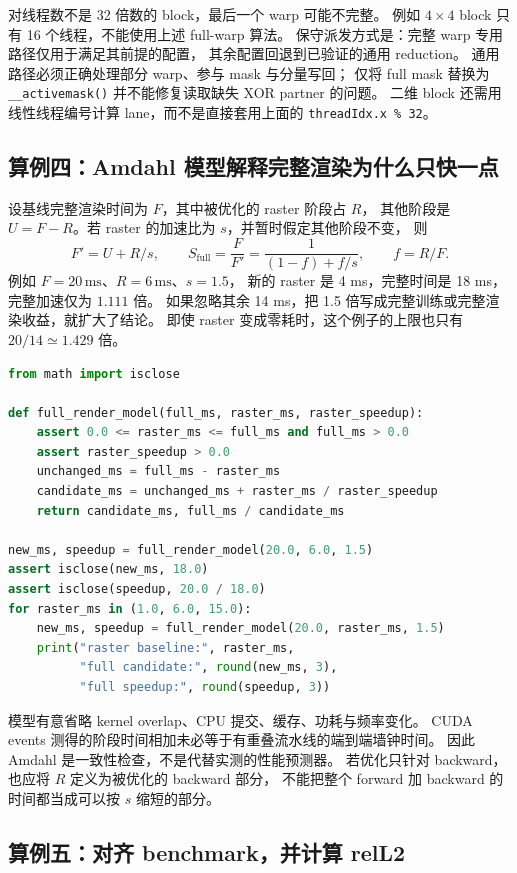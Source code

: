 对线程数不是 32 倍数的 block，最后一个 warp 可能不完整。
例如 \(4\times4\) block 只有 16 个线程，不能使用上述 full-warp 算法。
保守派发方式是：完整 warp 专用路径仅用于满足其前提的配置，
其余配置回退到已验证的通用 reduction。
通用路径必须正确处理部分 warp、参与 mask 与分量写回；
仅将 full mask 替换为 \texttt{\_\_activemask()} 并不能修复读取缺失 XOR partner 的问题。
二维 block 还需用线性线程编号计算 lane，而不是直接套用上面的
\texttt{threadIdx.x \% 32}。

\subsection{算例四：Amdahl 模型解释完整渲染为什么只快一点}

设基线完整渲染时间为 \(F\)，其中被优化的 raster 阶段占 \(R\)，
其他阶段是 \(U=F-R\)。若 raster 的加速比为 \(s\)，并暂时假定其他阶段不变，
则
\[
 F'=U+R/s,\qquad
 S_{\mathrm{full}}=\frac{F}{F'}
 =\frac{1}{(1-f)+f/s},\qquad f=R/F.
\]
例如 \(F=20\,\mathrm{ms}\)、\(R=6\,\mathrm{ms}\)、\(s=1.5\)，
新的 raster 是 4 ms，完整时间是 18 ms，完整加速仅为 \(1.111\) 倍。
如果忽略其余 14 ms，把 1.5 倍写成完整训练或完整渲染收益，就扩大了结论。
即使 raster 变成零耗时，这个例子的上限也只有 \(20/14\simeq1.429\) 倍。

\begin{lstlisting}[language=Python]
from math import isclose

def full_render_model(full_ms, raster_ms, raster_speedup):
    assert 0.0 <= raster_ms <= full_ms and full_ms > 0.0
    assert raster_speedup > 0.0
    unchanged_ms = full_ms - raster_ms
    candidate_ms = unchanged_ms + raster_ms / raster_speedup
    return candidate_ms, full_ms / candidate_ms

new_ms, speedup = full_render_model(20.0, 6.0, 1.5)
assert isclose(new_ms, 18.0)
assert isclose(speedup, 20.0 / 18.0)
for raster_ms in (1.0, 6.0, 15.0):
    new_ms, speedup = full_render_model(20.0, raster_ms, 1.5)
    print("raster baseline:", raster_ms,
          "full candidate:", round(new_ms, 3),
          "full speedup:", round(speedup, 3))
\end{lstlisting}

模型有意省略 kernel overlap、CPU 提交、缓存、功耗与频率变化。
CUDA events 测得的阶段时间相加未必等于有重叠流水线的端到端墙钟时间。
因此 Amdahl 是一致性检查，不是代替实测的性能预测器。
若优化只针对 backward，也应将 \(R\) 定义为被优化的 backward 部分，
不能把整个 forward 加 backward 的时间都当成可以按 \(s\) 缩短的部分。

\subsection{算例五：对齐 benchmark，并计算 relL2}

